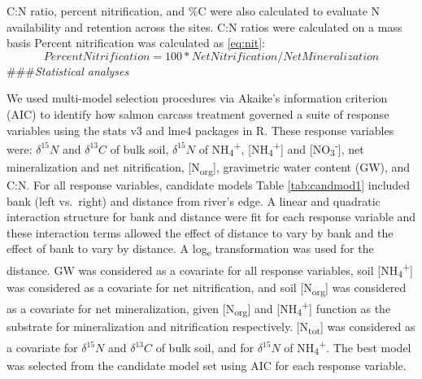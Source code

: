 \documentclass [11pt, proquest] {uwthesis}[2015/03/03]
\begin{document}
C:N ratio, percent nitrification, and \%C were also calculated to evaluate N availability and retention across the sites. C:N ratios were calculated on a mass basis Percent nitrification was calculated as \eqref{eq:nit}:
\begin{equation} 
 Percent Nitrification =100 * Net Nitrification / Net Mineralization 
  \label{eq:nit}
\end{equation}
\#\#\#\emph{Statistical analyses}

We used multi-model selection procedures via Akaike's information criterion (AIC) to identify how salmon carcass treatment governed a suite of response variables using the stats v3 and lme4 packages in R. These response variables were: \(\delta^{15}N\) and \(\delta^{13}C\) of bulk soil, \(\delta^{15}N\) of NH\textsubscript{4}\textsuperscript{+}, {[}NH\textsubscript{4}\textsuperscript{+}{]} and {[}NO\textsubscript{3}\textsuperscript{-}{]}, net mineralization and net nitrification, {[}N\textsubscript{org}{]}, gravimetric water content (GW), and C:N. For all response variables, candidate models Table \ref{tab:candmod1} included bank (left vs.~right) and distance from river's edge. A linear and quadratic interaction structure for bank and distance were fit for each response variable and these interaction terms allowed the effect of distance to vary by bank and the effect of bank to vary by distance. A log\textsubscript{e} transformation was used for the distance. GW was considered as a covariate for all response variables, soil {[}NH\textsubscript{4}\textsuperscript{+}{]} was considered as a covariate for net nitrification, and soil {[}N\textsubscript{org}{]} was considered as a covariate for net mineralization, given {[}N\textsubscript{org}{]} and {[}NH\textsubscript{4}\textsuperscript{+}{]} function as the substrate for mineralization and nitrification respectively. {[}N\textsubscript{tot}{]} was considered as a covariate for \(\delta^{15}N\) and \(\delta^{13}C\) of bulk soil, and for \(\delta^{15}N\) of NH\textsubscript{4}\textsuperscript{+}. The best model was selected from the candidate model set using AIC for each response variable.
\end{document}
